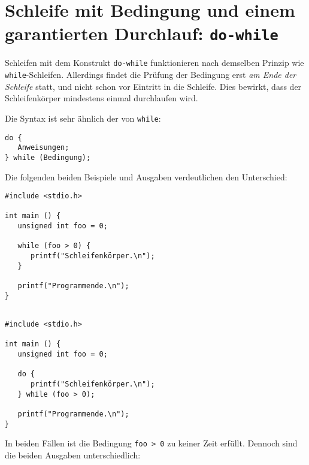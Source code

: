 \section{Schleife mit Bedingung und einem garantierten Durchlauf: \texttt{do-while}}
Schleifen mit dem Konstrukt \texttt{do-while} funktionieren nach demselben Prinzip wie \texttt{while}-Schleifen. Allerdings findet die Prüfung der Bedingung erst \emph{am Ende der Schleife} statt, und nicht schon vor Eintritt in die Schleife. Dies bewirkt, dass der Schleifenkörper mindestens einmal durchlaufen wird.

Die Syntax ist sehr ähnlich der von \texttt{while}:
\begin{codebox}
\begin{verbatim}
do {
   Anweisungen;
} while (Bedingung);
\end{verbatim}
\end{codebox}

Die folgenden beiden Beispiele und Ausgaben verdeutlichen den Unterschied:
\begin{tcbraster}[raster columns=2,
                  raster equal height,
                  nobeforeafter,
                  raster column skip=0.5cm]
\begin{codebox}
\begin{verbatim}
#include <stdio.h>

int main () {
   unsigned int foo = 0;
   
   while (foo > 0) {
      printf("Schleifenkörper.\n");
   }
   
   printf("Programmende.\n");
}
\end{verbatim}
\end{codebox}
%
\begin{codebox}
\begin{verbatim}

#include <stdio.h>

int main () {
   unsigned int foo = 0;
   
   do {
      printf("Schleifenkörper.\n");
   } while (foo > 0);
   
   printf("Programmende.\n");
}
\end{verbatim}
\end{codebox}
\end{tcbraster}

In beiden Fällen ist die Bedingung \texttt{foo > 0} zu keiner Zeit erfüllt. Dennoch sind die beiden Ausgaben unterschiedlich:

